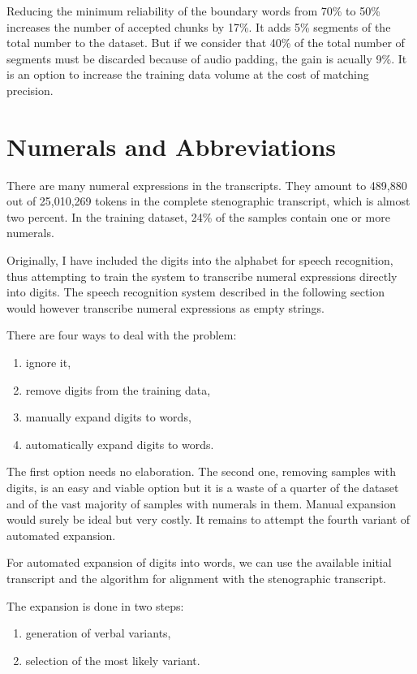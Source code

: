 \documentclass[conference]{IEEEtran}
\begin{document}
Reducing the minimum reliability of the boundary words from 70\% to 50\% increases
the number of accepted chunks by 17\%. It adds 5\% segments
of the total number to the dataset. But if we consider that 40\% of the total
number of segments must be discarded because of audio padding, the gain is
acually 9\%. It is an option to increase the training data volume at the cost
of matching precision.

\section{Numerals and Abbreviations}

There are many numeral expressions in the transcripts. They amount to 489,880
out of 25,010,269 tokens in the complete stenographic transcript, which is
almost two percent. In the training dataset, 24\% of the samples contain one or
more numerals.

Originally, I have included the digits into the alphabet for speech recognition,
thus attempting to train the system to transcribe numeral expressions directly
into digits. The speech recognition system described in the following section
would however transcribe numeral expressions as empty strings.

There are four ways to deal with the problem:
\begin{enumerate}
\item{ignore it,}
\item{remove digits from the training data,}
\item{manually expand digits to words,}
\item{automatically expand digits to words.}
\end{enumerate}

The first option needs no elaboration. The second one, removing samples with
digits, is an easy and viable option but it is a waste of a quarter of the
dataset and of the vast majority of samples with numerals in them. Manual
expansion would surely be ideal but very costly. It remains to attempt the
fourth variant of automated expansion.

For automated expansion of digits into words, we can use the available initial
transcript and the algorithm for alignment with the stenographic transcript.

The expansion is done in two steps:
\begin{enumerate}
\item{generation of verbal variants,}
\item{selection of the most likely variant.}
\end{enumerate}
\end{document}
